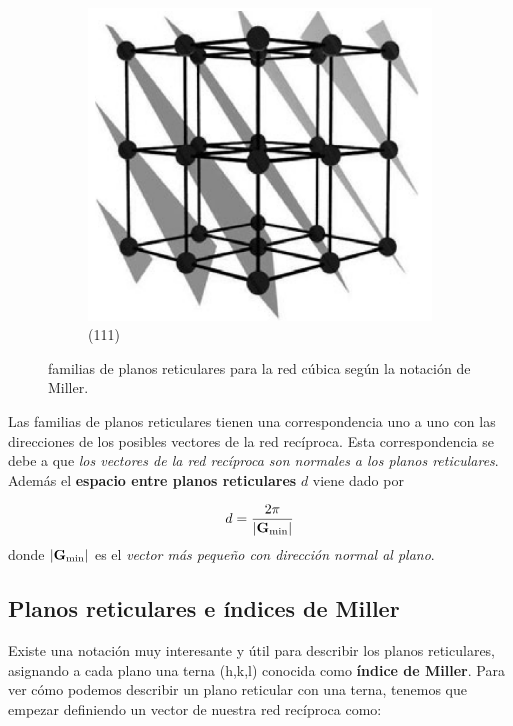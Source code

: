 \begin{figure}[h!]
	\begin{subfigure}{0.3\linewidth} \centering
	\includegraphics[scale=0.3]{Cuerpo/Ch_02/111.png}
	\caption{(111)}
	\end{subfigure}
	\caption{familias de planos reticulares para la red cúbica \sc según la notación de Miller.}
\end{figure}

Las familias de planos reticulares tienen una correspondencia uno a uno con las direcciones de los posibles vectores de la red recíproca. Esta correspondencia se debe a que \textit{los vectores de la red recíproca son normales a los planos reticulares}. Además el  \textbf{espacio entre planos reticulares} $d$ viene dado por 

\begin{equation}
	d = \frac{2\pi}{|\mathbf{G}_{\min}|} \label{Ec:02-01-06}
\end{equation}
donde $|\mathbf{G}_{\min}|$ es el \textit{vector más pequeño con dirección normal al plano}.


\subsection{Planos reticulares e índices de Miller}

Existe una notación muy interesante y útil para describir los planos reticulares, asignando a cada plano una terna (h,k,l) conocida como \textbf{índice de Miller}. Para ver cómo podemos describir un plano reticular con una terna, tenemos que empezar definiendo un vector de nuestra red recíproca como:


